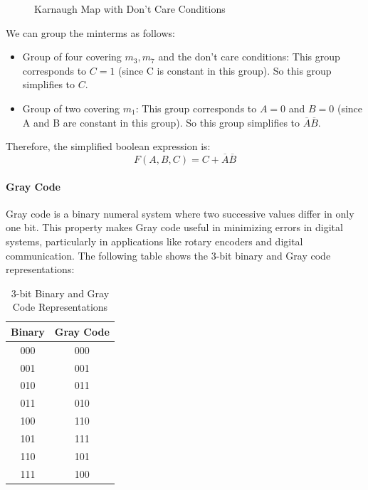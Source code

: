 \documentclass[11pt]{report}
\begin{document}
\begin{example}
\begin{figure}[h!]
        \caption{Karnaugh Map with Don't Care Conditions}
        \label{fig:example_dont_care_karnaugh_map}
    \end{figure}
    We can group the minterms as follows:
    \begin{itemize}
        \item Group of four covering $m_3, m_7$ and the don't care conditions: This group corresponds to $C = 1$ (since C is constant in this group). So this group simplifies to $C$.
        \item Group of two covering $m_1$: This group corresponds to $A = 0$ and $B = 0$ (since A and B are constant in this group). So this group simplifies to $\overline{A}\overline{B}$.
    \end{itemize}
    Therefore, the simplified boolean expression is:
    $$
    F(A,B,C) = C + \overline{A}\overline{B}
    $$
\end{example}

\paragraph{Gray Code}
Gray code is a binary numeral system where two successive values differ in only one bit. This property makes Gray code useful in minimizing errors in digital systems, particularly in applications like rotary encoders and digital communication.
The following table shows the 3-bit binary and Gray code representations:
\begin{table}[h!]
    \centering
    \begin{tabular}{|c|c|}
        \hline
        Binary & Gray Code \\
        \hline
        000 & 000 \\
        001 & 001 \\
        010 & 011 \\
        011 & 010 \\
        100 & 110 \\
        101 & 111 \\
        110 & 101 \\
        111 & 100 \\
        \hline
    \end{tabular}
    \caption{3-bit Binary and Gray Code Representations}
    \label{tab:3_bit_binary_gray_code}
\end{table}
\end{document}
